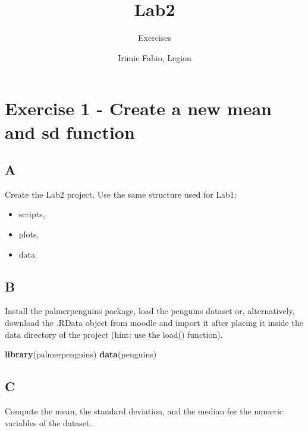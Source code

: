 \documentclass[
]{article}
\title{Lab2}
\subtitle{Exercises}
\author{Irimie Fabio, Legion}
\date{}
\newenvironment{Shaded}{\begin{snugshade}}{\end{snugshade}}
\newcommand{\FunctionTok}[1]{\textcolor[rgb]{0.13,0.29,0.53}{\textbf{#1}}}
\newcommand{\NormalTok}[1]{#1}
\providecommand{\tightlist}{%
  \setlength{\itemsep}{0pt}\setlength{\parskip}{0pt}}
\begin{document}
\maketitle

{
\setcounter{tocdepth}{2}
\tableofcontents
}
\hypertarget{exercise-1---create-a-new-mean-and-sd-function}{%
\section{Exercise 1 - Create a new mean and sd
function}\label{exercise-1---create-a-new-mean-and-sd-function}}

\hypertarget{a}{%
\subsection{A}\label{a}}

Create the Lab2 project. Use the same structure used for Lab1:

\begin{itemize}
\tightlist
\item
  scripts,
\item
  plots,
\item
  data
\end{itemize}

\hypertarget{b}{%
\subsection{B}\label{b}}

Install the palmerpenguins package, load the penguins dataset or,
alternatively, download the .RData object from moodle and import it
after placing it inside the data directory of the project (hint: use the
load() function).

\begin{Shaded}
\begin{Highlighting}[]
\FunctionTok{library}\NormalTok{(palmerpenguins)}
\FunctionTok{data}\NormalTok{(penguins)}
\end{Highlighting}
\end{Shaded}

\hypertarget{c}{%
\subsection{C}\label{c}}

Compute the mean, the standard deviation, and the median for the numeric
variables of the dataset.
\end{document}
